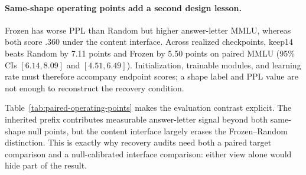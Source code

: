 \paragraph{Same-shape operating points add a second design lesson.}
Frozen has worse PPL than Random but higher answer-letter MMLU, whereas both
score .360 under the content interface. Across realized checkpoints, keep14
beats Random by 7.11 points and Frozen by 5.50 points on paired MMLU
(95\% CIs $[6.14,8.09]$ and $[4.51,6.49]$). Initialization, trainable modules,
and learning rate must therefore accompany endpoint scores; a shape label and
PPL value are not enough to reconstruct the recovery condition.


Table~\ref{tab:paired-operating-points} makes the evaluation contrast explicit.
The inherited prefix contributes measurable answer-letter signal beyond both
same-shape null points, but the content interface largely erases the
Frozen--Random distinction. This is exactly why recovery audits need both a
paired target comparison and a null-calibrated interface comparison: either
view alone would hide part of the result.
